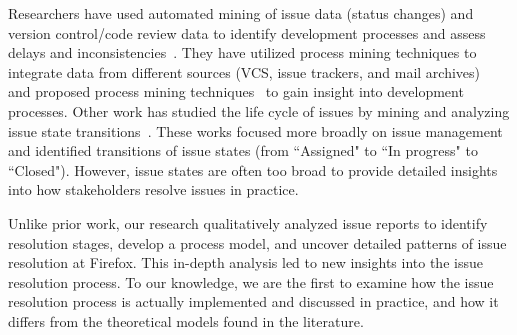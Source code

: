 Researchers have used automated mining of issue data (\eg status changes) and version control/code review data to identify development processes and assess delays and inconsistencies~\cite{marques2018assessing,krismayer2019using}. 
They have utilized process mining techniques to integrate data from different sources (\eg VCS, issue trackers, and mail archives)~\cite{poncin2011process, gupta2014process,mittal2014process} and proposed process mining techniques~\cite{rubin2007process,gupta2014nirikshan,saini2020control} to gain insight into development processes. Other work has studied the life cycle of issues by mining and analyzing issue state transitions~\cite{eren2023analyzing,dobrzynski2016tracing,wang2012predicting,coremans2023process}.
These works focused more broadly on issue management and identified transitions of issue states (\eg from ``Assigned" to ``In progress" to ``Closed"). 
However, issue states are often too broad to provide detailed insights into how stakeholders resolve issues in practice.




Unlike prior work, our research qualitatively analyzed issue reports to identify resolution stages, develop a process model, and uncover detailed patterns of issue resolution at Firefox. This in-depth analysis led to new insights into the issue resolution process. To our knowledge, we are the first to examine how the issue resolution process is actually implemented and discussed in practice, and how it differs from the theoretical models found in the literature.